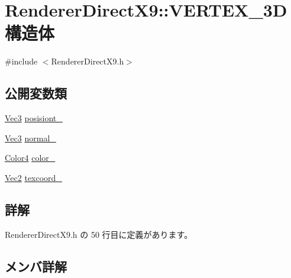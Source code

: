 \hypertarget{struct_renderer_direct_x9_1_1_v_e_r_t_e_x__3_d}{}\section{Renderer\+Direct\+X9\+:\+:V\+E\+R\+T\+E\+X\+\_\+3D 構造体}
\label{struct_renderer_direct_x9_1_1_v_e_r_t_e_x__3_d}


{\ttfamily \#include $<$Renderer\+Direct\+X9.\+h$>$}

\subsection*{公開変数類}
\begin{DoxyCompactItemize}
\item 
\mbox{\hyperlink{_vector3_d_8h_ab16f59e4393f29a01ec8b9bbbabbe65d}{Vec3}} \mbox{\hyperlink{struct_renderer_direct_x9_1_1_v_e_r_t_e_x__3_d_a15e30709ae06aa5bc8e73054e9f160e9}{posisiont\+\_\+}}
\item 
\mbox{\hyperlink{_vector3_d_8h_ab16f59e4393f29a01ec8b9bbbabbe65d}{Vec3}} \mbox{\hyperlink{struct_renderer_direct_x9_1_1_v_e_r_t_e_x__3_d_a14a5a2f215062bb76fc69daa45160904}{normal\+\_\+}}
\item 
\mbox{\hyperlink{_vector3_d_8h_a9c2339f516cf07ce4753b8a99fab3791}{Color4}} \mbox{\hyperlink{struct_renderer_direct_x9_1_1_v_e_r_t_e_x__3_d_ac81f0059a82d7005a8bd3cfb189cb277}{color\+\_\+}}
\item 
\mbox{\hyperlink{_vector3_d_8h_a5ef6e95dfc5f9d3820b71772d99bbc25}{Vec2}} \mbox{\hyperlink{struct_renderer_direct_x9_1_1_v_e_r_t_e_x__3_d_a240251febb14de7b0a6525d3b305f516}{texcoord\+\_\+}}
\end{DoxyCompactItemize}


\subsection{詳解}


 Renderer\+Direct\+X9.\+h の 50 行目に定義があります。



\subsection{メンバ詳解}
\mbox{\label{struct_renderer_direct_x9_1_1_v_e_r_t_e_x__3_d_ac81f0059a82d7005a8bd3cfb189cb277}} 

